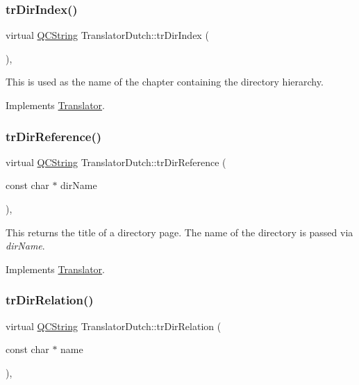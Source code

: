 \subsubsection{\texorpdfstring{trDirIndex()}{trDirIndex()}}
{\footnotesize\ttfamily virtual \mbox{\hyperlink{class_q_c_string}{Q\+C\+String}} Translator\+Dutch\+::tr\+Dir\+Index (\begin{DoxyParamCaption}{ }\end{DoxyParamCaption})\hspace{0.3cm}{\ttfamily [inline]}, {\ttfamily [virtual]}}

This is used as the name of the chapter containing the directory hierarchy. 

Implements \mbox{\hyperlink{class_translator}{Translator}}.

\mbox{\label{class_translator_dutch_a6c0a46fdb1c78958376f82593bab09a2}} 
\subsubsection{\texorpdfstring{trDirReference()}{trDirReference()}}
{\footnotesize\ttfamily virtual \mbox{\hyperlink{class_q_c_string}{Q\+C\+String}} Translator\+Dutch\+::tr\+Dir\+Reference (\begin{DoxyParamCaption}\item[{const char $\ast$}]{dir\+Name }\end{DoxyParamCaption})\hspace{0.3cm}{\ttfamily [inline]}, {\ttfamily [virtual]}}

This returns the title of a directory page. The name of the directory is passed via {\itshape dir\+Name}. 

Implements \mbox{\hyperlink{class_translator}{Translator}}.

\mbox{\label{class_translator_dutch_ac039a8666db97c31698cc70e450821ad}} 
\subsubsection{\texorpdfstring{trDirRelation()}{trDirRelation()}}
{\footnotesize\ttfamily virtual \mbox{\hyperlink{class_q_c_string}{Q\+C\+String}} Translator\+Dutch\+::tr\+Dir\+Relation (\begin{DoxyParamCaption}\item[{const char $\ast$}]{name }\end{DoxyParamCaption})\hspace{0.3cm}{\ttfamily [inline]}, {\ttfamily [virtual]}}

